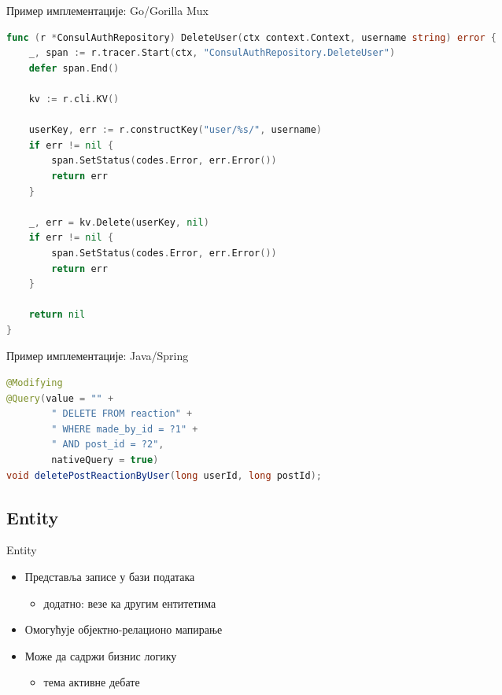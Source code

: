\documentclass[aspectratio=169]{beamer}
\begin{document}
    \begin{frame}[fragile]{Пример имплементације: Go/Gorilla Mux}
        \begin{adjustbox}{width=\textwidth,height=\textheight,keepaspectratio}
            \begin{lstlisting}[language=go]
func (r *ConsulAuthRepository) DeleteUser(ctx context.Context, username string) error {
    _, span := r.tracer.Start(ctx, "ConsulAuthRepository.DeleteUser")
    defer span.End()

    kv := r.cli.KV()

    userKey, err := r.constructKey("user/%s/", username)
    if err != nil {
        span.SetStatus(codes.Error, err.Error())
        return err
    }

    _, err = kv.Delete(userKey, nil)
    if err != nil {
        span.SetStatus(codes.Error, err.Error())
        return err
    }

    return nil
}
            \end{lstlisting}
        \end{adjustbox}
    \end{frame}
    
    \begin{frame}[fragile]{Пример имплементације: Java/Spring}
        \begin{adjustbox}{width=\textwidth,height=\textheight,keepaspectratio}
            \begin{lstlisting}[language=java]
@Modifying
@Query(value = "" +
        " DELETE FROM reaction" +
        " WHERE made_by_id = ?1" +
        " AND post_id = ?2",
        nativeQuery = true)
void deletePostReactionByUser(long userId, long postId);
            \end{lstlisting}
        \end{adjustbox}
    \end{frame}
    
    \subsection[]{Entity}
    
    \begin{frame}{Entity}
        \begin{itemize}
            \item Представља записе у бази података
            \begin{itemize}
                \item додатно: везе ка другим ентитетима
            \end{itemize}
            \item Омогућује објектно-релационо мапирање
            \item Може да садржи бизнис логику
            \begin{itemize}
                \item тема активне дебате
            \end{itemize}
        \end{itemize}
    \end{frame}
    
\end{document}
